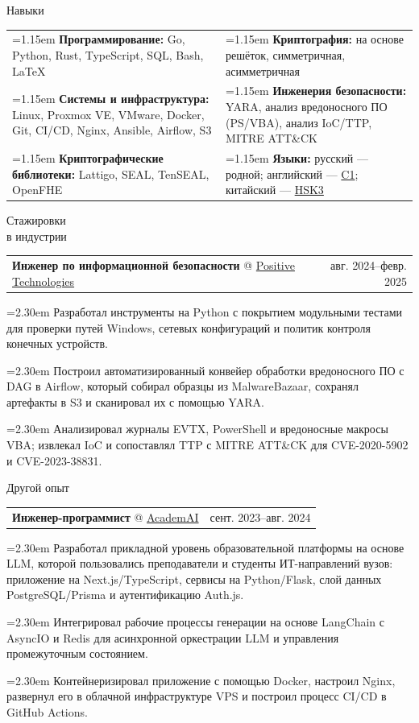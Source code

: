 \documentclass[11pt,a4paper]{article}
\makeatletter
\newcommand{\cvrow}[2]{%
  \noindent
  \begin{minipage}[t]{0.145\textwidth}
    \vspace{0pt}%
    \raggedright
    \fontsize{10.5}{12.5}\selectfont
    #1
  \end{minipage}%
  \hfill
  \begin{minipage}[t]{0.835\textwidth}
    \vspace{0pt}%
    #2
  \end{minipage}\par
}
\newcommand{\skillcell}[2]{%
  \noindent
  \hangindent=1.15em
  \hangafter=1
  \makebox[1.15em][l]{$\diamond$}%
  \textbf{#1} #2%
}
\newcommand{\workentry}[2]{%
  \noindent
  \begin{tabularx}{\linewidth}
    {@{}X@{\hspace{0.8em}}r@{}}
    #1 & \small #2
  \end{tabularx}\par
  \vspace{0.15em}
}
\newcommand{\workproject}[1]{%
  \noindent
  \hangindent=2.30em
  \hangafter=1
  \hspace*{1.15em}\makebox[1.15em][l]{$\diamond$}#1\par
  \vspace{0.12em}
}
\makeatother
\begin{document}
\cvrow{Навыки}{%
  \begin{tabularx}{\linewidth}
    {@{}>{\raggedright\arraybackslash}X
    @{\hspace{1.2em}}
    >{\raggedright\arraybackslash}X@{}}

    \skillcell{Программирование:}{%
      Go, Python, Rust, TypeScript, SQL, Bash, LaTeX}
    &
    \skillcell{Криптография:}{%
      на основе решёток, симметричная,
      асимметричная}
    \\[0.20em]

    \skillcell{Системы и инфраструктура:}{%
      Linux, Proxmox VE, VMware, Docker, Git, CI/CD, Nginx, Ansible,
      Airflow, S3}
    &
    \skillcell{Инженерия безопасности:}{%
      YARA, анализ вредоносного ПО (PS/VBA), анализ IoC/TTP,
      MITRE ATT\&CK}
    \\[0.20em]

    \skillcell{Криптографические библиотеки:}{%
      Lattigo, SEAL, TenSEAL, OpenFHE}
    &
    \skillcell{Языки:}{%
      русский --- родной;
      английский --- \href{https://iasenovets.github.io/files/toefl_8cd5f4a2b8ec8f34da49ea0faeef43f1.pdf}{C1};
      китайский --- \href{https://admin.chinesetest.cn/queryScore.do?sid=c2tActR9Wb\%2704b861aefbdc5e9fd0b44afa717d08cbceb0720e582ce25f\%2724d7sWsQ5nVUQSwD}{HSK3}}
  \end{tabularx}
}

\vspace{0.50em}

\cvrow{Стажировки\\в индустрии}{%
  \workentry
    {\textbf{Инженер по информационной безопасности} @
    \href{https://global.ptsecurity.com/en/}{Positive Technologies}}
    {авг. 2024--февр. 2025}

  \workproject{Разработал инструменты на Python с покрытием модульными тестами
  для проверки путей Windows, сетевых конфигураций и политик контроля
  конечных устройств.}
  \workproject{Построил автоматизированный конвейер обработки вредоносного ПО
  с DAG в Airflow, который собирал образцы из MalwareBazaar, сохранял
  артефакты в S3 и сканировал их с помощью YARA.}
  \workproject{Анализировал журналы EVTX, PowerShell и вредоносные макросы VBA;
  извлекал IoC и сопоставлял TTP с MITRE ATT\&CK для CVE-2020-5902
  и CVE-2023-38831.}
}

\vspace{0.50em}

\cvrow{Другой опыт}{%
  \workentry
    {\textbf{Инженер-программист} @ \href{https://academai.ru/}{AcademAI}}
    {сент. 2023--авг. 2024}
  \workproject{Разработал прикладной уровень образовательной платформы на основе
  LLM, которой пользовались преподаватели и студенты ИТ-направлений вузов:
  приложение на Next.js/TypeScript, сервисы на Python/Flask, слой данных
  PostgreSQL/Prisma и аутентификацию Auth.js.}
  \workproject{Интегрировал рабочие процессы генерации на основе LangChain
  с AsyncIO и Redis для асинхронной оркестрации LLM и управления
  промежуточным состоянием.}
  \workproject{Контейнеризировал приложение с помощью Docker, настроил Nginx,
  развернул его в облачной инфраструктуре VPS и построил процесс CI/CD
  в GitHub Actions.}
}
\end{document}
